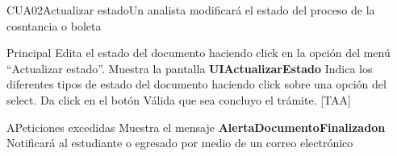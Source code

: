 \begin{UseCase}{CUA02}{Actualizar estado}{Un analista modificará el estado del proceso de la cosntancia o boleta}
{\begin{itemize}
		\end{itemize}
  }
\end{UseCase}

\begin{UCtrayectoria}{Principal}
  \UCpaso[\UCactor] Edita el estado del documento  haciendo click en la opción del menú ``Actualizar estado”.
  \UCpaso Muestra la pantalla  {\bf UIActualizarEstado}
  \UCpaso[\UCactor] Indica los diferentes  tipos de estado del documento haciendo click sobre una opción del select.
  \UCpaso[\UCactor] Da click en el botón 
  \UCpaso  Válida que sea concluyo el trámite. [TAA] 
\end{UCtrayectoria} 

\begin{UCtrayectoriaA}{A}{Peticiones excedidas} 
\UCpaso Muestra el mensaje {\bf AlertaDocumentoFinalizadon}
  \UCpaso Notificará al estudiante o egresado por medio de un correo electrónico  	
\end{UCtrayectoriaA}

